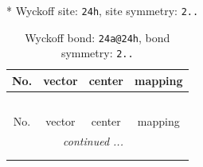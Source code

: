 \documentclass[fleqn,8pt]{jsarticle}
\begin{document}
* Wyckoff site: {\tt 24h}, site symmetry: {\tt 2..}
\renewcommand{\arraystretch}{1.2}
\begin{longtable}{cccc}
\caption{Wyckoff bond: {\tt 24a@24h}, bond symmetry: {\tt 2..}}
 \\
 \hline \hline
No. & vector & center & mapping \\ \hline \endfirsthead

\multicolumn{3}{l}{\tablename\ \thetable{}} \\
 \hline \hline
No. & vector & center & mapping \\ \hline \endhead

 \hline \hline
\multicolumn{3}{r}{\footnotesize\it continued ...} \\ \endfoot

 \hline \hline
\multicolumn{3}{r}{} \\ \endlastfoot


\end{longtable}
\end{document}
